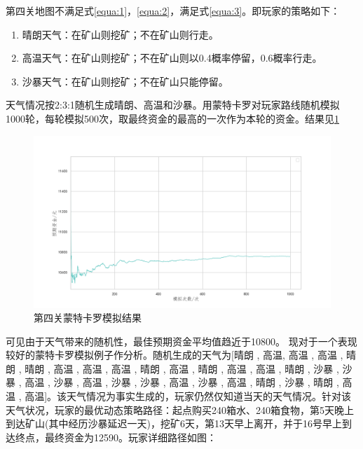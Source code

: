 \documentclass[withoutpreface,bwprint]{cumcmthesis} %
\begin{document}
第四关地图不满足式\cref{equa:1}，\cref{equa:2}，满足式\cref{equa:3}。即玩家的策略如下：
\begin{enumerate}
    \item 晴朗天气：在矿山则挖矿；不在矿山则行走。
    \item 高温天气：在矿山则挖矿；不在矿山则以0.4概率停留，0.6概率行走。
    \item 沙暴天气：在矿山则挖矿；不在矿山只能停留。
\end{enumerate}
天气情况按2:3:1随机生成晴朗、高温和沙暴。用蒙特卡罗对玩家路线随机模拟1000轮，每轮模拟500次，取最终资金的最高的一次作为本轮的资金。结果见\cref{fig:check4}
\begin{figure}[H]
    \centering
    \includegraphics[scale=0.5]{figures/check4.png}
    \caption{第四关蒙特卡罗模拟结果}
    \label{fig:check4}
\end{figure}
可见由于天气带来的随机性，最佳预期资金平均值趋近于10800。
现对于一个表现较好的蒙特卡罗模拟例子作分析。随机生成的天气为[晴朗 , 高温,  高温 ,  高温 ,  晴朗 ,  晴朗 ,  高温 ,  高温 ,  高温 ,  晴朗 ,  高温 ,  晴朗 ,  高温 ,  高温 ,  晴朗 ,  沙暴 ,  沙暴 ,  高温 ,  沙暴 ,  高温 ,  沙暴 ,  沙暴 ,  高温 ,  沙暴 ,  高温 ,  晴朗 ,  沙暴 ,  晴朗 ,  高温 ,  高温]。该天气情况为事实生成的，玩家仍然仅知道当天的天气情况。针对该天气状况，玩家的最优动态策略路径：起点购买240箱水、240箱食物，第5天晚上到达矿山(其中经历沙暴延迟一天)，挖矿6天，第13天早上离开，并于16号早上到达终点，最终资金为12590。玩家详细路径如图：
\end{document}
